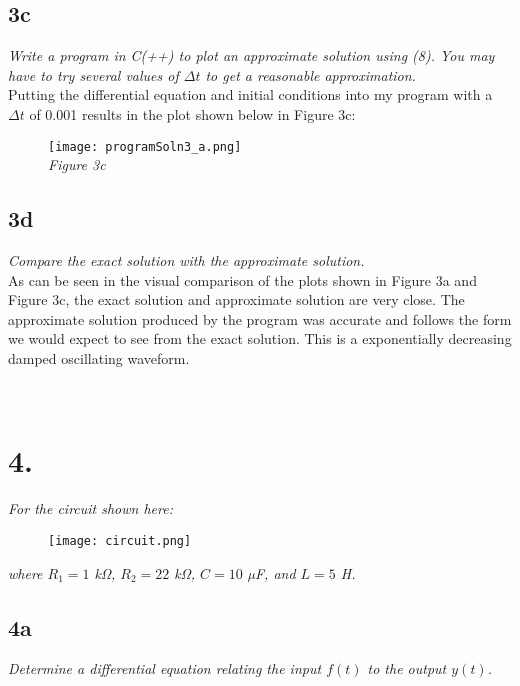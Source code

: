 \documentclass[10pt, AMS Euler]{article}
\begin{document}
\subsection*{3c}
\textit{Write a program in C(++) to plot an approximate solution using (8). You may have to try several
values of $\Delta t$ to get a reasonable approximation.}\\

Putting the differential equation and initial conditions into my program with a $\Delta t$ of 0.001 results in the plot shown below in Figure 3c:

\begin{figure}[H]
    \centering
    \texttt{[image: programSoln3\_a.png]}\\
    \textit{Figure 3c}
\end{figure}

\subsection*{3d}
\textit{Compare the exact solution with the approximate solution.}\\

As can be seen in the visual comparison of the plots shown in Figure 3a and Figure 3c, the exact solution and approximate solution are very close. The approximate solution produced by the program was accurate and follows the form we would expect to see from the exact solution. This is a exponentially decreasing damped oscillating waveform.


\noindent \underline{\hspace{7in}}\\
\section*{4.}
\textit{For the circuit shown here:}
\begin{figure}[H]
    \centering
    \texttt{[image: circuit.png]}
\end{figure}

\textit{where $R_1 = 1$ kΩ, $R_2 = 22$ kΩ, $C = 10$ µF, and $L = 5$ H.}

\subsection*{4a}
\textit{Determine a differential equation relating the input $f(t)$ to the output $y(t)$.}\\
\end{document}
